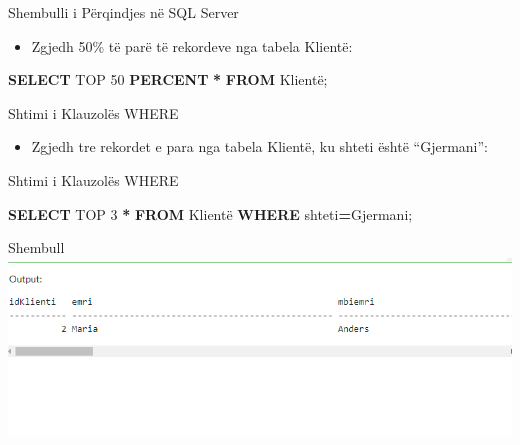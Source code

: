 \documentclass[
  ignorenonframetext,
]{beamer}
\newenvironment{Shaded}{\begin{snugshade}}{\end{snugshade}}
\newcommand{\DecValTok}[1]{\textcolor[rgb]{0.00,0.00,0.81}{#1}}
\newcommand{\KeywordTok}[1]{\textcolor[rgb]{0.13,0.29,0.53}{\textbf{#1}}}
\newcommand{\NormalTok}[1]{#1}
\newcommand{\OperatorTok}[1]{\textcolor[rgb]{0.81,0.36,0.00}{\textbf{#1}}}
\newcommand{\StringTok}[1]{\textcolor[rgb]{0.31,0.60,0.02}{#1}}
\providecommand{\tightlist}{%
  \setlength{\itemsep}{0pt}\setlength{\parskip}{0pt}}
\begin{document}
\begin{frame}[fragile]{Shembulli i Përqindjes në SQL Server}
\label{shembulli-i-puxebrqindjes-nuxeb-sql-server}
\begin{itemize}
\tightlist
\item
  Zgjedh 50\% të parë të rekordeve nga tabela Klientë:
\end{itemize}


\begin{Shaded}
\begin{Highlighting}[]
\KeywordTok{SELECT}\NormalTok{ TOP }\DecValTok{50} \KeywordTok{PERCENT} \OperatorTok{*} \KeywordTok{FROM}\NormalTok{ Klientë;}
\end{Highlighting}
\end{Shaded}
\end{frame}

\begin{frame}{Shtimi i Klauzolës WHERE}
\label{shtimi-i-klauzoluxebs-where}
\begin{itemize}
\tightlist
\item
  Zgjedh tre rekordet e para nga tabela Klientë, ku shteti është
  ``Gjermani'':
\end{itemize}
\end{frame}

\begin{frame}[fragile]{Shtimi i Klauzolës WHERE}
\label{shtimi-i-klauzoluxebs-where-1}

\begin{Shaded}
\begin{Highlighting}[]
\KeywordTok{SELECT}\NormalTok{ TOP }\DecValTok{3} \OperatorTok{*} \KeywordTok{FROM}\NormalTok{ Klientë}
\KeywordTok{WHERE}\NormalTok{ shteti}\OperatorTok{=}\StringTok{\textquotesingle{}Gjermani\textquotesingle{}}\NormalTok{;}
\end{Highlighting}
\end{Shaded}
\end{frame}

\begin{frame}{Shembull}
\label{shembull-16}
\includegraphics{./Figs/query41.png}
\end{frame}
\end{document}
